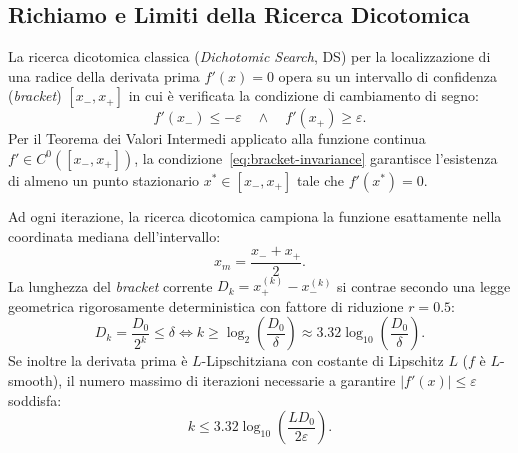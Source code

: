\subsection{Richiamo e Limiti della Ricerca Dicotomica}
La ricerca dicotomica classica (\textit{Dichotomic Search}, DS) per la localizzazione di una radice della derivata prima $f'(x) = 0$ opera su un intervallo di confidenza (\textit{bracket}) $[x_-, x_+]$ in cui \`e verificata la condizione di cambiamento di segno:
\begin{equation}
    f'(x_-) \le -\varepsilon \quad \land \quad f'(x_+) \ge \varepsilon.
    \label{eq:bracket-invariance}
\end{equation}
Per il Teorema dei Valori Intermedi applicato alla funzione continua $f' \in C^0([x_-, x_+])$, la condizione~\eqref{eq:bracket-invariance} garantisce l'esistenza di almeno un punto stazionario $x^* \in [x_-, x_+]$ tale che $f'(x^*) = 0$.

Ad ogni iterazione, la ricerca dicotomica campiona la funzione esattamente nella coordinata mediana dell'intervallo:
\begin{equation}
    x_m = \frac{x_- + x_+}{2}.
\end{equation}
La lunghezza del \textit{bracket} corrente $D_k = x_+^{(k)} - x_-^{(k)}$ si contrae secondo una legge geometrica rigorosamente deterministica con fattore di riduzione $r = 0.5$:
\begin{equation}
    D_k = \frac{D_0}{2^k} \le \delta \iff k \ge \log_2\left(\frac{D_0}{\delta}\right) \approx 3.32 \log_{10}\left(\frac{D_0}{\delta}\right).
\end{equation}
Se inoltre la derivata prima \`e $L$-Lipschitziana con costante di Lipschitz $L$ ($f$ \`e $L$-smooth), il numero massimo di iterazioni necessarie a garantire $|f'(x)| \le \varepsilon$ soddisfa:
\begin{equation}
    k \le 3.32 \log_{10}\left(\frac{L D_0}{2\varepsilon}\right).
\end{equation}

